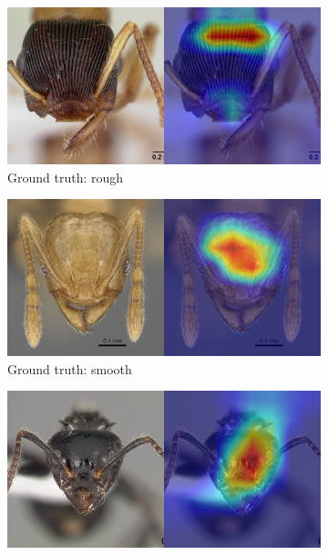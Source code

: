 \documentclass[12pt]{article}
\begin{document}
\begin{figure}
    \centering
    \begin{subfigure}{\subwidth}
        \includegraphics[width=1\linewidth]{assets/gradcam/incorrect_ideal/84.png}
        \caption{Ground truth: rough}
        \label{fig:incorrect_ideal_84}
    \end{subfigure}
    \begin{subfigure}{\subwidth}
        \includegraphics[width=1\linewidth]{assets/gradcam/incorrect_ideal/86.png}
        \caption{Ground truth: smooth}
        \label{fig:incorrect_ideal_86}
    \end{subfigure}
    \begin{subfigure}{\subwidth}
        \includegraphics[width=1\linewidth]{assets/gradcam/incorrect_ideal/177.png}

\end{subfigure}
\end{figure}
\end{document}
